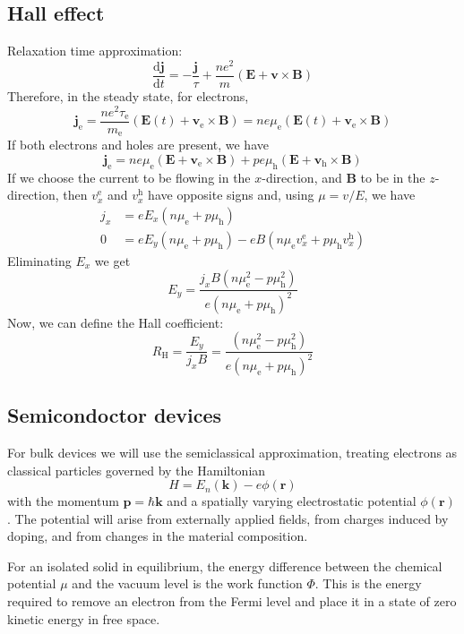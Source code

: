 \documentclass[12pt,a4paper]{article}
\begin{document}
\subsection{Hall effect}
Relaxation time approximation:
$$
\frac{\mathrm{d} \boldsymbol{j}}{\mathrm{d} t}=-\frac{\boldsymbol{j}}{\tau}+\frac{n e^2}{m}(\boldsymbol{E}+\boldsymbol{v} \times \boldsymbol{B})
$$
Therefore, in the steady state, for electrons,
$$
\boldsymbol{j}_{\mathrm{e}}=\frac{n e^2 \tau_{\mathrm{e}}}{m_{\mathrm{e}}}\left(\boldsymbol{E}(t)+\boldsymbol{v}_{\mathrm{e}} \times \boldsymbol{B}\right)=n e \mu_{\mathrm{e}}\left(\boldsymbol{E}(t)+\boldsymbol{v}_{\mathrm{e}} \times \boldsymbol{B}\right)
$$
If both electrons and holes are present, we have
$$
\boldsymbol{j}_{\mathrm{e}}=n e \mu_{\mathrm{e}}\left(\boldsymbol{E}+\boldsymbol{v}_{\mathrm{e}} \times \boldsymbol{B}\right)+p e \mu_{\mathrm{h}}\left(\boldsymbol{E}+\boldsymbol{v}_{\mathrm{h}} \times \boldsymbol{B}\right)
$$
If we choose the current to be flowing in the $x$-direction, and $\boldsymbol{B}$ to be in the $z$-direction, then $v_x^{\mathrm{e}}$ and $v_x^{\mathrm{h}}$ have opposite signs and, using $\mu=v / E$, we have
$$
\begin{aligned}
j_x & =e E_x\left(n \mu_{\mathrm{e}}+p \mu_{\mathrm{h}}\right) \\
0 & =e E_y\left(n \mu_{\mathrm{e}}+p \mu_{\mathrm{h}}\right)-e B\left(n \mu_{\mathrm{e}} v_x^{\mathrm{e}}+p \mu_{\mathrm{h}} v_x^{\mathrm{h}}\right) 
\end{aligned}
$$
Eliminating $E_x$ we get
$$
E_y=\frac{j_x B\left(n \mu_{\mathrm{e}}^2-p \mu_{\mathrm{h}}^2\right)}{e\left(n \mu_{\mathrm{e}}+p \mu_{\mathrm{h}}\right)^2}
$$
Now, we can define the Hall coefficient:
$$
R_{\mathrm{H}}=\frac{E_y}{j_x B}=\frac{\left(n \mu_{\mathrm{e}}^2-p \mu_{\mathrm{h}}^2\right)}{e\left(n \mu_{\mathrm{e}}+p \mu_{\mathrm{h}}\right)^2}
$$
\subsection{Semicondoctor devices}
For bulk devices we will use the semiclassical approximation, treating electrons as classical particles governed by the Hamiltonian
$$
H=E_n(\boldsymbol{k})-e \phi(\boldsymbol{r})
$$
with the momentum $\boldsymbol{p}=\hbar \boldsymbol{k}$ and a spatially varying electrostatic potential $\phi(\boldsymbol{r})$. The potential will arise from externally applied fields, from charges induced by doping, and from changes in the material composition.

For an isolated solid in equilibrium, the energy difference between the chemical potential $\mu$ and the vacuum level is the work function $\Phi$. This is the energy required to remove an electron from the Fermi level and place it in a state of zero kinetic energy in free space.
\end{document}

